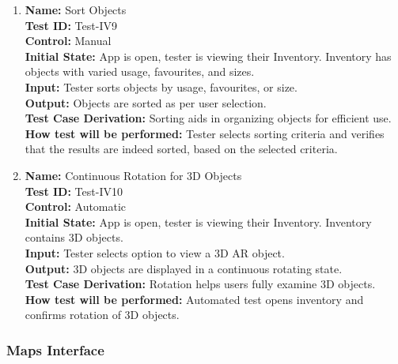 \documentclass[12pt, titlepage]{article}
\begin{document}
\begin{enumerate}
  \item \textbf{Name:} Sort Objects \label{itm:Test-IV9} \\
  \textbf{Test ID:} Test-IV9 \\
  \textbf{Control:} Manual \\
  \textbf{Initial State:} App is open, tester is viewing their Inventory. Inventory has objects with varied usage, favourites, and sizes. \\
  \textbf{Input:} Tester sorts objects by usage, favourites, or size. \\
  \textbf{Output:} Objects are sorted as per user selection. \\
  \textbf{Test Case Derivation:} Sorting aids in organizing objects for efficient use. \\
  \textbf{How test will be performed:} Tester selects sorting criteria and verifies that the results are indeed sorted, based on the selected criteria. \\

  \item \textbf{Name:} Continuous Rotation for 3D Objects \label{itm:Test-IV10} \\
  \textbf{Test ID:} Test-IV10 \\
  \textbf{Control:} Automatic \\
  \textbf{Initial State:} App is open, tester is viewing their Inventory. Inventory contains 3D objects. \\
  \textbf{Input:} Tester selects option to view a 3D AR object. \\
  \textbf{Output:} 3D objects are displayed in a continuous rotating state. \\
  \textbf{Test Case Derivation:} Rotation helps users fully examine 3D objects. \\
  \textbf{How test will be performed:} Automated test opens inventory and confirms rotation of 3D objects. \\

\end{enumerate}

\subsubsection{Maps Interface}
\end{document}
